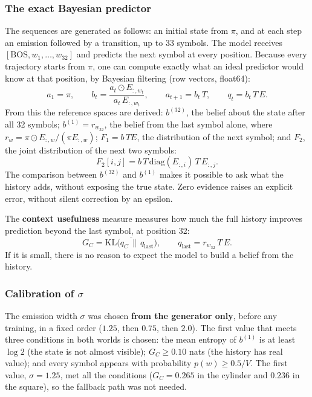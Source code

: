 \documentclass[12pt,a4paper]{article}
\newcommand{\en}[1]{\foreignlanguage{english}{#1}}   %
\newcommand{\bel}[1]{b^{(#1)}}
\newcommand{\GC}{G_{C}}
\newcommand{\KL}{\mathrm{KL}}
\begin{document}
\subsubsection{The exact Bayesian predictor}
The sequences are generated as follows: an initial state from $\pi$, and at each step an emission followed by a transition, up to 33 symbols. The model receives $[\mathrm{BOS},w_1,\dots,w_{32}]$ and predicts the next symbol at every position. Because every trajectory starts from $\pi$, one can compute exactly what an ideal predictor would know at that position, by Bayesian filtering (row vectors, \en{float64}):
\begin{equation}
a_1=\pi,\qquad
b_t=\frac{a_t\odot E_{:,w_t}}{a_t\,E_{:,w_t}},\qquad
a_{t+1}=b_t\,T,\qquad
q_t=b_t\,T\,E .
\end{equation}
From this the reference spaces are derived: $\bel{32}$, the belief about the state after all 32 symbols; $\bel{1}=r_{w_{32}}$, the belief from the last symbol alone, where $r_w=\pi\odot E_{:,w}/(\pi E_{:,w})$; $F_1=b\,TE$, the distribution of the next symbol; and $F_2$, the joint distribution of the next two symbols:
\begin{equation}
F_2[i,j]=b\,T\,\mathrm{diag}(E_{:,i})\,T\,E_{:,j}.
\end{equation}
The comparison between $\bel{32}$ and $\bel{1}$ makes it possible to ask what the history adds, without exposing the true state. Zero evidence raises an explicit error, without silent correction by an epsilon.

The \textbf{context usefulness} measure measures how much the full history improves prediction beyond the last symbol, at position 32:
\begin{equation}
\GC=\overline{\KL\big(q_C\,\|\,q_{\mathrm{last}}\big)},\qquad q_{\mathrm{last}}=r_{w_{32}}\,T\,E .
\end{equation}
If it is small, there is no reason to expect the model to build a belief from the history.

\subsubsection{Calibration of $\sigma$}
The emission width $\sigma$ was chosen \textbf{from the generator only}, before any training, in a fixed order ($1.25$, then $0.75$, then $2.0$). The first value that meets three conditions in both worlds is chosen: the mean entropy of $\bel{1}$ is at least $\log 2$ (the state is not almost visible); $\GC\ge0.10$ \en{nats} (the history has real value); and every symbol appears with probability $p(w)\ge0.5/V$. The first value, $\sigma=1.25$, met all the conditions ($\GC=0.265$ in the cylinder and $0.236$ in the square), so the fallback path was not needed.
\end{document}
